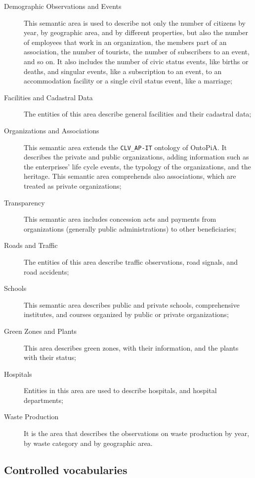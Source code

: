 \begin{description}
  \item[Demographic Observations and Events] This semantic area is used to describe not only the number of citizens by year, by geographic area, and by different properties, but also the number of employees that work in an organization, the members part of an association, the number of tourists, the number of subscribers to an event, and so on. It also includes the number of civic status events, like births or deaths, and singular events, like a subscription to an event, to an accommodation facility or a single civil status event, like a marriage;
  \item[Facilities and Cadastral Data] The entities of this area describe general facilities and their cadastral data;
  \item[Organizations and Associations] This semantic area extends the \verb#CLV_AP-IT# ontology of OntoPiA. It describes the private and public organizations, adding information such as the enterprises' life cycle events, the typology of the organizations, and the heritage. This semantic area comprehends also associations, which are treated as private organizations;
  \item[Transparency] This semantic area includes concession acts and payments from organizations (generally public administrations) to other beneficiaries;
  \item[Roads and Traffic] The entities of this area describe traffic observations, road signals, and road accidents;
  \item[Schools] This semantic area describes public and private schools, comprehensive institutes, and courses organized by public or private organizations;
  \item[Green Zones and Plants] This area describes green zones, with their information, and the plants with their status;
  \item[Hospitals] Entities in this area are used to describe hospitals, and hospital departments;
  \item[Waste Production] It is the area that describes the observations on waste production by year, by waste category and by geographic area.
\end{description}

\subsection{Controlled vocabularies}
\label{subsec:controlled-vocabularies}

